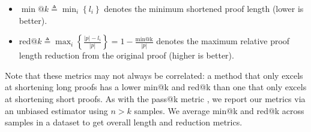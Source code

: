\begin{itemize}
\itemsep1pt
    \item $\min@k \triangleq \min_i \left\{ l_i \right\}$ denotes the minimum shortened proof length (lower is better).
    \item $\mathrm{red}@k \triangleq \max_i \left\{ \frac{|p|-l_i}{|p|} \right\} = 1 - \frac{\text{min@k}}{|p|}$ denotes the maximum relative proof length reduction from the original proof (higher is better).
\end{itemize}
%
Note that these metrics may not always be correlated: a method that only excels at shortening long proofs has a lower min@k and red@k than one that only excels at shortening short proofs. As with the pass@k metric \citep{chen2021evaluatinglargelanguagemodels}, we report our metrics via an unbiased estimator using $n > k$ samples. We average min@k and red@k across samples in a dataset to get overall length and reduction metrics.
